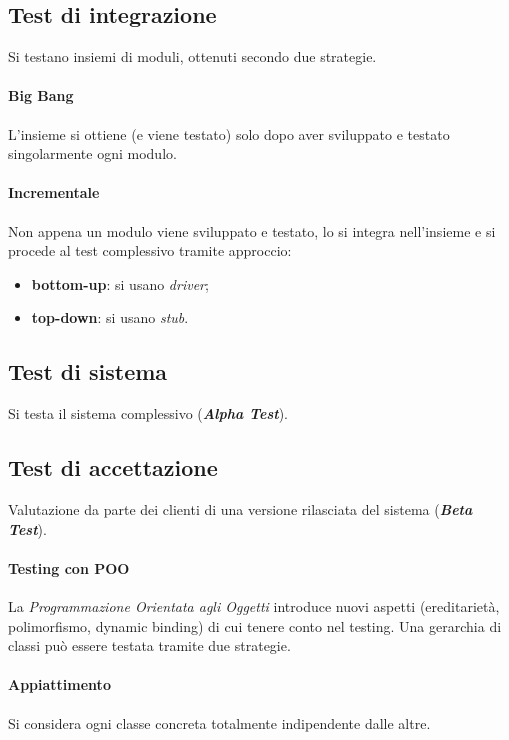 \subsection{Test di integrazione}
Si testano insiemi di moduli, ottenuti secondo due strategie.

\paragraph{Big Bang} L'insieme si ottiene (e viene testato) solo dopo aver sviluppato e testato singolarmente ogni modulo.

\paragraph{Incrementale} Non appena un modulo viene sviluppato e testato, lo si integra nell'insieme e si procede al test complessivo tramite approccio:
\begin{itemize}
    \item \textbf{bottom-up}: si usano \textit{driver};
    \item \textbf{top-down}: si usano \textit{stub}.
\end{itemize}

\subsection{Test di sistema} Si testa il sistema complessivo (\textbf{\textit{Alpha Test}}).

\subsection{Test di accettazione} Valutazione da parte dei clienti di una versione rilasciata del sistema (\textbf{\textit{Beta Test}}).

\newpage

\paragraph{Testing con POO}

La \textit{Programmazione Orientata agli Oggetti} introduce nuovi aspetti (ereditarietà, polimorfismo, dynamic binding) di cui tenere conto nel testing. Una gerarchia di classi può essere testata tramite due strategie.

\paragraph{Appiattimento}  Si considera ogni classe concreta totalmente indipendente dalle altre.

